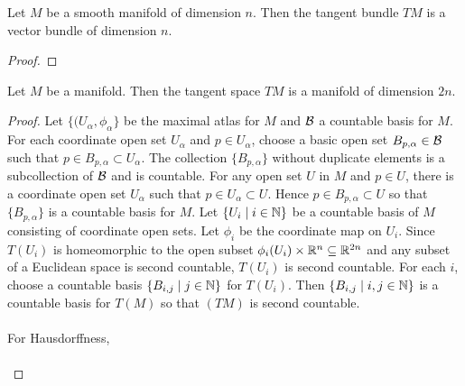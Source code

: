 \documentclass[a4paper]{article}
\begin{document}
\begin{prp}{}{} Let $M$ be a smooth manifold of dimension $n$. Then the tangent bundle $TM$ is a vector bundle of dimension $n$. \tcbline
\begin{proof}

\end{proof}
\end{prp}

\begin{thm}{}{} Let $M$ be a manifold. Then the tangent space $TM$ is a manifold of dimension $2n$. \tcbline
\begin{proof}
Let $\{(U_\alpha,\phi_\alpha\}$ be the maximal atlas for $M$ and $\mathcal{B}$ a countable basis for $M$. For each coordinate open set $U_\alpha$ and $p\in U_\alpha$, choose a basic open set $B_{p,\alpha}\in\mathcal{B}$ such that $p\in B_{p,\alpha}\subset U_\alpha$. The collection $\{B_{p,\alpha}\}$ without duplicate elements is a subcollection of $\mathcal{B}$ and is countable. For any open set $U$ in $M$ and $p\in U$, there is a coordinate open set $U_\alpha$ such that $p\in U_\alpha\subset U$. Hence $p\in B_{p,\alpha}\subset U$ so that $\{B_{p,\alpha}\}$ is a countable basis for $M$. Let $\{U_i\;|\;i\in\mathbb{N}\}$ be a countable basis of $M$ consisting of coordinate open sets. Let $\phi_i$ be the coordinate map on $U_i$. Since $T(U_i)$ is homeomorphic to the open subset $\phi_i(U_i)\times\mathbb{R}^n\subseteq\mathbb{R}^{2n}$ and any subset of a Euclidean space is second countable, $T(U_i)$ is second countable. For each $i$, choose a countable basis $\{B_{i,j}\;|\;j\in\mathbb{N}\}$ for $T(U_i)$. Then $\{B_{i,j}\;|\;i,j\in\mathbb{N}\}$ is a countable basis for $T(M)$ so that $(TM)$ is second countable. \\~\\

For Hausdorffness,\\~\\


\end{proof}
\end{thm}
\end{document}
